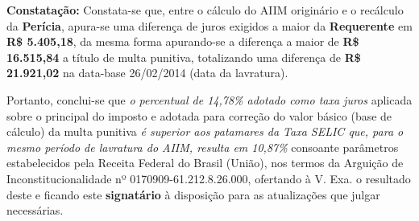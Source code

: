 \textbf{Constatação:} Constata-se que, entre o cálculo do AIIM originário e o recálculo da \textbf{Perícia}, apura-se uma diferença de juros exigidos a maior da \textbf{Requerente} em \textbf{R\$ 5.405,18}, da mesma forma apurando-se a diferença a maior de \textbf{R\$ 16.515,84} a título de multa punitiva, totalizando uma diferença de \textbf{R\$ 21.921,02} na data-base 26/02/2014 (data da lavratura).

Portanto, conclui-se que \emph{o percentual de 14,78\% adotado como taxa juros} aplicada sobre o principal do imposto e adotada para correção do valor básico (base de cálculo) da multa punitiva \emph{é superior aos patamares da Taxa SELIC que, para o mesmo período de lavratura do AIIM, resulta em 10,87\%} consoante parâmetros estabelecidos pela Receita Federal do Brasil (União), nos termos da Arguição de Inconstitucionalidade nº 0170909-61.212.8.26.000, ofertando à V. Exa. o resultado deste e ficando este \textbf{signatário} à disposição para as atualizações que julgar necessárias.